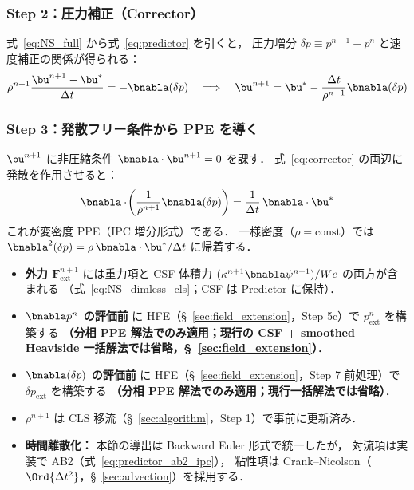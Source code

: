 \subsubsection{Step 2：圧力補正（Corrector）}

式~\eqref{eq:NS_full} から式~\eqref{eq:predictor} を引くと，
圧力増分 $\delta p \equiv p^{n+1} - p^n$ と速度補正の関係が得られる：
\begin{equation}
  \rho^{n+1}\frac{\bu^{n+1} - \bu^*}{\Delta t} = -\bnabla(\delta p)
  \quad\Longrightarrow\quad
  \bu^{n+1} = \bu^* - \frac{\Delta t}{\rho^{n+1}}\bnabla(\delta p)
  \label{eq:corrector}
\end{equation}

\subsubsection{Step 3：発散フリー条件から PPE を導く}

$\bu^{n+1}$ に非圧縮条件 $\bnabla\cdot\bu^{n+1}=0$ を課す．
式~\eqref{eq:corrector} の両辺に発散を作用させると：
\begin{equation}
  \bnabla\cdot\!\left(\frac{1}{\rho^{n+1}}\bnabla(\delta p)\right)
  = \frac{1}{\Delta t}\,\bnabla\cdot\bu^*
  \label{eq:PPE_varrho}
\end{equation}
これが変密度 PPE（IPC 増分形式）である．
一様密度（$\rho=\mathrm{const}$）では $\bnabla^2(\delta p) = \rho\,\bnabla\cdot\bu^*/\Delta t$ に帰着する．

\begin{tcolorbox}[mybox, title={実装上の注意}]
\begin{itemize}
  \item \textbf{外力 $\bm{F}_\text{ext}^{n+1}$} には重力項と CSF 体積力
        $(\kappa^{n+1}\bnabla\psi^{n+1})/We$ の両方が含まれる
        （式~\eqref{eq:NS_dimless_cls}；CSF は Predictor に保持）．
  \item \textbf{$\bnabla p^n$ の評価前} に HFE（§~\ref{sec:field_extension}，Step 5c）で
        $p^n_{\mathrm{ext}}$ を構築する
        \textbf{（分相 PPE 解法でのみ適用；現行の CSF + smoothed Heaviside 一括解法では省略，§~\ref{sec:field_extension}）}．
  \item \textbf{$\bnabla(\delta p)$ の評価前} に
        HFE（§~\ref{sec:field_extension}，Step 7 前処理）で $\delta p_{\mathrm{ext}}$ を構築する
        \textbf{（分相 PPE 解法でのみ適用；現行一括解法では省略）}．
  \item \textbf{$\rho^{n+1}$} は CLS 移流（§~\ref{sec:algorithm}，Step 1）で事前に更新済み．
  \item \textbf{時間離散化：} 本節の導出は Backward Euler 形式で統一したが，
        対流項は実装で AB2（式~\eqref{eq:predictor_ab2_ipc}），
        粘性項は Crank--Nicolson（$\Ord{\Delta t^2}$，§~\ref{sec:advection}）を採用する．
\end{itemize}
\end{tcolorbox}

